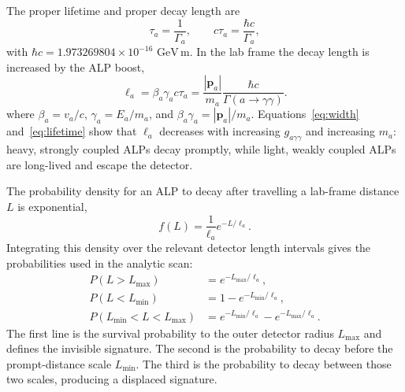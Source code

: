 \documentclass[12pt,a4paper]{article}
\begin{document}
The proper lifetime and proper decay length are
\begin{equation}
    \tau_a=\frac{1}{\Gamma_a},
    \qquad
    c\tau_a=\frac{\hbar c}{\Gamma_a},
    \label{eq:proper_lifetime}
\end{equation}
with $\hbar c=1.973269804\times10^{-16}\,\,\text{GeV}\,\mathrm{m}$. In the lab frame
the decay length is increased by the ALP boost,
\begin{equation}
    \ell_a
    =
    \beta_a\gamma_a c\tau_a
    =
    \frac{|\mathbf{p}_a|}{m_{a}}
    \frac{\hbar c}{\Gamma(a\to\gamma\gamma)}.
    \label{eq:lifetime}
\end{equation}
where $\beta_a=v_a/c$, $\gamma_a=E_a/m_{a}$, and
$\beta_a\gamma_a=|\mathbf{p}_a|/m_{a}$. Equations~\eqref{eq:width}
and~\eqref{eq:lifetime} show that $\ell_a$ decreases with increasing
$g_{a\gamma\gamma}$ and increasing $m_{a}$: heavy, strongly coupled ALPs decay promptly,
while light, weakly coupled ALPs are long-lived and escape the detector.

The probability density for an ALP to decay after travelling a lab-frame
distance $L$ is exponential,
\begin{equation}
    f(L)=\frac{1}{\ell_a}e^{-L/\ell_a}.
\end{equation}
Integrating this density over the relevant detector length intervals gives the
probabilities used in the analytic scan:
\begin{align}
    P(L>L_\mathrm{max})
    &=
    e^{-L_\mathrm{max}/\ell_a},
    \label{eq:survival_prob}\\
    P(L<L_\mathrm{min})
    &=
    1-e^{-L_\mathrm{min}/\ell_a},\\
    P(L_\mathrm{min}<L<L_\mathrm{max})
    &=
    e^{-L_\mathrm{min}/\ell_a}
    -
    e^{-L_\mathrm{max}/\ell_a}.
    \label{eq:decay_window_prob}
\end{align}
The first line is the survival probability to the outer detector radius
$L_\mathrm{max}$ and defines the invisible signature. The second is the
probability to decay before the prompt-distance scale $L_\mathrm{min}$. The
third is the probability to decay between those two scales, producing a
displaced signature.
\end{document}
